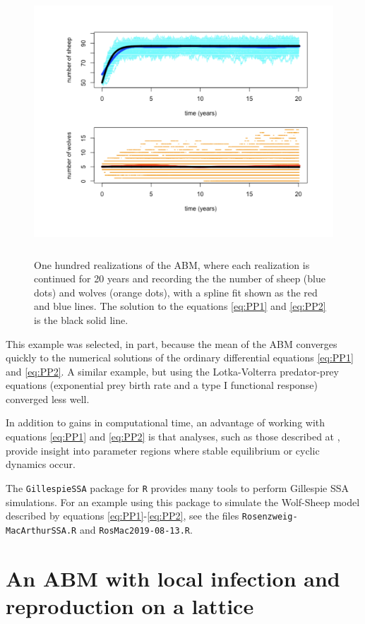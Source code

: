 \documentclass[11pt, oneside]{article}   	%
\begin{document}
\begin{figure}[!ht]
\includegraphics[height=10cm]{R_Analysis}
\caption[]{One hundred realizations of the ABM, where each realization is continued for 20 years and recording the the number of sheep (blue dots) and wolves (orange dots), with a spline fit shown as the red and blue lines. The solution to the equations \ref{eq:PP1} and \ref{eq:PP2} is the black solid line.}\label{fig:R}
\end{figure}
\FloatBarrier

This example was selected, in part, because the mean of the ABM converges quickly to the numerical solutions of the ordinary differential equations \ref{eq:PP1} and \ref{eq:PP2}. A similar example, but using the Lotka-Volterra predator-prey equations (exponential prey birth rate and a type I functional response) converged less well.

In addition to gains in computational time, an advantage of working with equations \ref{eq:PP1} and \ref{eq:PP2} is that analyses, such as those described at \cite{wiki}, provide insight into parameter regions where stable equilibrium or cyclic dynamics occur.

The \texttt{GillespieSSA} package for \texttt{R} provides many tools to perform Gillespie SSA simulations. For an example using this package to simulate the Wolf-Sheep model described by equations \ref{eq:PP1}-\ref{eq:PP2}, see the files \texttt{Rosenzweig-MacArthurSSA.R} and \texttt{RosMac2019-08-13.R}.

\section{An ABM with local infection and reproduction on a lattice}\label{sec:PA}
\end{document}
